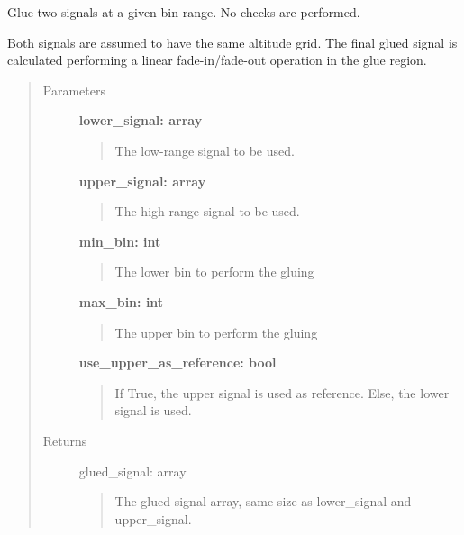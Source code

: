 \documentclass[letterpaper,10pt,english]{sphinxmanual}
\begin{document}
\begin{fulllineitems}
\label{pre_processing:pre_processing.glue_signals_at_bins}
Glue two signals at a given bin range. No checks are performed.

Both signals are assumed to have the same altitude grid. The final glued signal is calculated
performing a linear fade-in/fade-out operation in the glue region.
\begin{quote}\begin{description}
\item[{Parameters}] \leavevmode
\textbf{lower\_signal: array}
\begin{quote}

The low-range signal to be used.
\end{quote}

\textbf{upper\_signal: array}
\begin{quote}

The high-range signal to be used.
\end{quote}

\textbf{min\_bin: int}
\begin{quote}

The lower bin to perform the gluing
\end{quote}

\textbf{max\_bin: int}
\begin{quote}

The upper bin to perform the gluing
\end{quote}

\textbf{use\_upper\_as\_reference: bool}
\begin{quote}

If True, the upper signal is used as reference. Else, the lower signal is used.
\end{quote}

\item[{Returns}] \leavevmode
glued\_signal: array
\begin{quote}

The glued signal array, same size as lower\_signal and upper\_signal.
\end{quote}

\end{description}\end{quote}

\end{fulllineitems}
\end{document}
